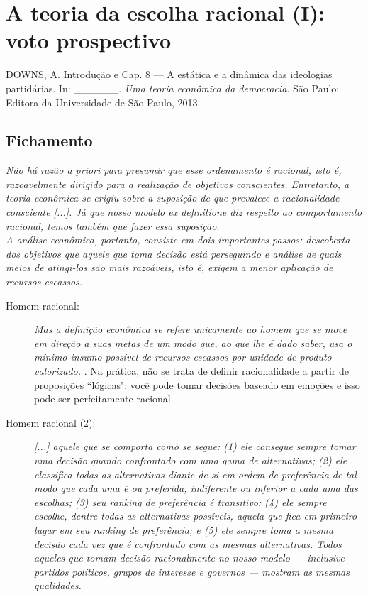 \section{A teoria da escolha racional (I): voto prospectivo}

DOWNS, A. Introdução e Cap. 8 --- A estática e a dinâmica das ideologias partidárias. In: \_\_\_\_\_\_. \textit{Uma teoria econômica da democracia}. São Paulo: Editora da Universidade de São Paulo, 2013.

\subsection{Fichamento}

\noindent \textit{Não há razão a priori para presumir que esse ordenamento é racional, isto é, razoavelmente dirigido para a realização de objetivos conscientes. Entretanto, a teoria econômica se erigiu sobre a suposição de que prevalece a racionalidade consciente [...]. Já que nosso modelo ex definitione diz respeito ao comportamento racional, temos também que fazer essa suposição.} \cite[~p. 26]{downs} \\

\noindent \textit{A análise econômica, portanto, consiste em dois importantes passos: descoberta dos objetivos que aquele que toma decisão está perseguindo e análise de quais meios de atingi-los são mais razoáveis, isto é, exigem a menor aplicação de recursos escassos.} \cite[~p. 26]{downs} 

\begin{description}
    \item [Homem racional:] \textit{Mas a definição econômica se refere unicamente ao homem que se move em direção a suas metas de um modo que, ao que lhe é dado saber, usa o mínimo insumo possível de recursos escassos por unidade de produto valorizado.} \cite[~p. 27]{downs}. Na prática, não se trata de definir racionalidade a partir de proposições ``lógicas": você pode tomar decisões baseado em emoções e isso pode ser perfeitamente racional.
    
    \item [Homem racional (2):] \textit{[...] aquele que se comporta como se segue: (1) ele consegue sempre tomar uma decisão quando confrontado com uma gama de alternativas; (2) ele classifica todas as alternativas diante de si em ordem de preferência de tal modo que cada uma é ou preferida, indiferente ou inferior a cada uma das escolhas; (3) seu ranking de preferência é transitivo; (4) ele sempre escolhe, dentre todas as alternativas possíveis, aquela que fica em primeiro lugar em seu ranking de preferência; e (5) ele sempre toma a mesma decisão cada vez que é confrontado com as mesmas alternativas. Todos aqueles que tomam decisão racionalmente no nosso modelo --- inclusive partidos políticos, grupos de interesse e governos --- mostram as mesmas qualidades.} \cite[~p. 28]{downs}
\end{description}


